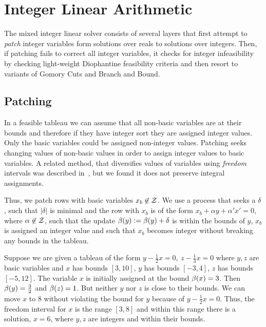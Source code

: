 \section{Integer Linear Arithmetic}
\label{sec:ip}

The mixed integer linear solver consists of several layers that first attempt to \emph{patch} integer variables
form solutions over reals to solutions over integers. Then, if patching fails to correct all integer variables,
it checks for integer infeasibility by checking light-weight Diophantine feasibility criteria and then resort to variants of
Gomory Cuts and Branch and Bound.


\subsection{Patching}


In a feasible tableau we can assume that all non-basic variables are at their bounds
and therefore if they have integer sort they are assigned integer values.
Only the basic variables could be assigned non-integer values.
Patching seeks changing values of non-basic values in order to assign integer values to basic variables.
A related method, that diversifies values of variables using \emph{freedom} intervals was
described in~\cite{MouraB08}, but we found it does not preserve integral assignments.

Thus, we patch rows with basic variables $x_b \not\in\mathcal{Z}$.
We use a process that seeks a $\delta$, such that $|\delta|$ is minimal
and the row with $x_b$ is of the form $x_b + \alpha y + \alpha'x' = 0$,
where $\alpha \not\in \mathcal{Z}$,
such that the update $\beta(y) := \beta(y) + \delta$ is within the bounds of $y$,
$x_b$ is assigned an integer value and such that $x_b$ becomes integer without 
breaking any bounds in the tableau.


\begin{example}
  Suppose we are given a tableau of the form
  $
 y - \frac{1}{2} x = 0, \ 
 z - \frac{1}{3} x  = 0
$
where $y, z$ are basic variables and $x$ has bounds $[3,10]$, $y$ has bounds $[-3,4]$, $z$ has bounds $[-5,12]$.
The variable $x$ is initially assigned at the bound $\beta(x) = 3$. Then $\beta(y) = \frac{3}{2}$ and
$\beta(z) = 1$. But neither $y$ nor $z$ is close to their bounds. We can move $x$ to $8$
without violating the bound for $y$ because of $y - \frac{1}{2} x = 0$.
Thus, the freedom interval for $x$ is the range $[3,8]$ and within this range there is a solution,
$x = 6$, where $y, z$ are integers and within their bounds.
\end{example}



